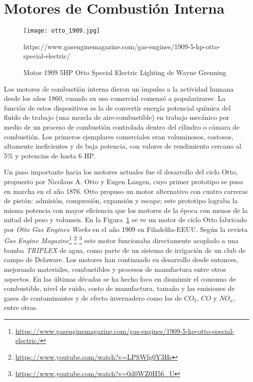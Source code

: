 \section{Motores de Combustión Interna}

\begin{figure} \centering \texttt{[image: otto\_1909.jpg]}
    \caption{Motor 1909 5HP Otto Special Electric Lighting de Wayne
Grenning}\label{fig:otto1909} %
https://www.gasenginemagazine.com/gas-engines/1909-5-hp-otto-special-electric/
\end{figure}

Los motores de combustión interna dieron un impulso a la actividad humana desde
los años 1860, cuando su uso comercial comenzó a popularizarse.
%
La función de estos dispositivos es la de convertir energía potencial química del fluido
de trabajo (una mezcla de aire-combustible) en trabajo mecánico por medio de un
proceso de combustión controlada dentro del cilindro o cámara de combustión.
%
Los primeros ejemplares comerciales eran voluminosos, costosos, altamente
ineficientes y de baja potencia, con valores de rendimiento cercano al 5\% y
potencias de hasta 6 HP.

Un paso importante hacia los motores actuales fue el desarrollo del ciclo Otto,
propuesto por Nicolaus A. Otto y Eugen Langen, cuyo primer prototipo se puso en
marcha en el año 1876.
%
Otto propuso un motor alternativo con cuatro carreras de pistón: admisión,
compresión, expansión y escape; este prototipo lograba la misma potencia con
mayor eficiencia que los motores de la época con menos de la mitad del peso y
volumen.
%
En la Figura~\ref{fig:otto1909} se ve un motor de ciclo Otto fabricado por
\emph{Otto Gas Engines Works} en el año 1909 en Filadelfia-EEUU.
%
Según la revista \emph{Gas Engine
Magazine}\footnote{\url{https://www.gasenginemagazine.com/gas-engines/1909-5-hp-otto-special-electric/}}
\footnote{ \url{https://www.youtube.com/watch?v=LPSWfg0Y3Hs} } \footnote{
\url{https://www.youtube.com/watch?v=0d0WZ0H56_U} } este motor funcionaba
directamente acoplado a una bomba \emph{TRIPLEX} de agua, como parte de un
sistema de irrigación de un club de campo de Delaware.
%
Los motores han continuado su desarrollo desde entonces, mejorando materiales,
combustibles y procesos de manufactura entre otros aspectos.
%
En las últimas décadas se ha hecho foco en disminuir el consumo de combustible,
nivel de ruido, costo de manufactura, tamaño y las emisiones de gases de
contaminantes y de efecto invernadero como las de $CO_2$, $CO$ y $NO_x$, entre
otras.


